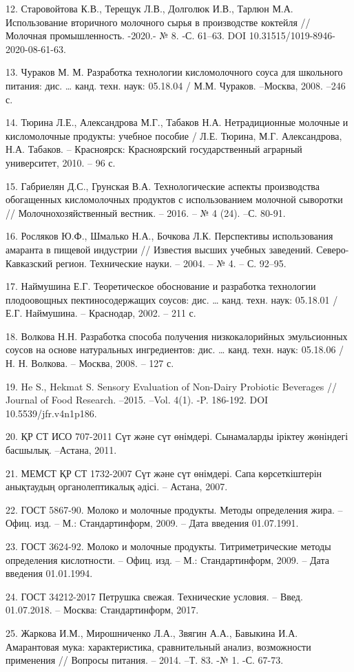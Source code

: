 \begin{references}
12. Старовойтова К.В., Терещук Л.В., Долголюк И.В., Тарлюн М.А.
Использование вторичного молочного сырья в производстве коктейля //
Молочная промышленность. -2020.- № 8. -С. 61--63. DOI
10.31515/1019-8946-2020-08-61-63.

13. Чураков М. М. Разработка технологии кисломолочного соуса для школьного
питания: дис. \ldots{} канд. техн. наук: 05.18.04 / М.М. Чураков.
--Москва, 2008. --246 с.

14. Тюрина Л.Е., Александрова М.Г., Табаков Н.А. Нетрадиционные молочные и
кисломолочные продукты: учебное пособие / Л.Е. Тюрина, М.Г.
Александрова, Н.А. Табаков. -- Красноярск: Красноярский
государственный аграрный университет, 2010. -- 96 с.

15. Габриелян Д.С., Грунская В.А. Технологические аспекты производства
обогащенных кисломолочных продуктов с использованием молочной
сыворотки // Молочнохозяйственный вестник. -- 2016. -- № 4 (24). --С.
80-91.

16. Росляков Ю.Ф., Шмалько Н.А., Бочкова Л.К. Перспективы использования
амаранта в пищевой индустрии // Известия высших учебных заведений.
Северо-Кавказский регион. Технические науки. -- 2004. -- № 4. -- С.
92--95.

17. Наймушина Е.Г. Теоретическое обоснование и разработка технологии
плодоовощных пектиносодержащих соусов: дис. \ldots{} канд. техн. наук:
05.18.01 / Е.Г. Наймушина. -- Краснодар, 2002. -- 211 с.

18. Волкова Н.Н. Разработка способа получения низкокалорийных эмульсионных
соусов на основе натуральных ингредиентов: дис. \ldots{} канд. техн.
наук: 05.18.06 / Н. Н. Волкова. -- Москва, 2008. -- 127 с.

19. He S., Hekmat S. Sensory Evaluation of Non-Dairy Probiotic Beverages
// Journal of Food Research. --2015. --Vol. 4(1). -P. 186-192. DOI
10.5539/jfr.v4n1p186.

20. ҚР СТ ИСО 707-2011 Сүт және сүт өнімдері. Сынамаларды іріктеу
жөніндегі басшылық. --Астана, 2011.

21. МЕМСТ ҚР СТ 1732-2007 Сүт және сүт өнімдері. Сапа көрсеткіштерін
анықтаудың органолептикалық әдісі. -- Астана, 2007.

22. ГОСТ 5867-90. Молоко и молочные продукты. Методы определения жира. --
Офиц. изд. -- М.: Стандартинформ, 2009. -- Дата введения 01.07.1991.

23. ГОСТ 3624-92. Молоко и молочные продукты. Титриметрические методы
определения кислотности. -- Офиц. изд. -- М.: Стандартинформ, 2009. --
Дата введения 01.01.1994.

24. ГОСТ 34212-2017 Петрушка свежая. Технические условия. -- Введ.
01.07.2018. -- Москва: Стандартинформ, 2017.

25. Жаркова И.М., Мирошниченко Л.А., Звягин А.А., Бавыкина И.А.
Амарантовая мука: характеристика, сравнительный анализ, возможности
применения // Вопросы питания. -- 2014. --Т. 83. -№ 1. -С. 67-73.
\end{references}

